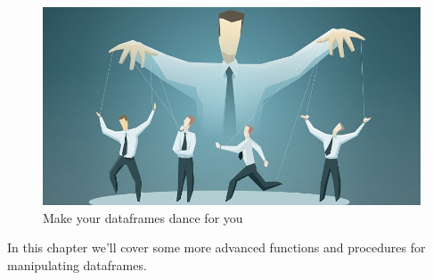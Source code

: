 \documentclass[]{book}
\theoremstyle{definition}
\theoremstyle{definition}
\theoremstyle{remark}
\begin{document}
\begin{figure}

{\centering \includegraphics[width=0.75\linewidth]{images/manipulation} 

}

\caption{Make your dataframes dance for you}\label{fig:dance}
\end{figure}

In this chapter we'll cover some more advanced functions and procedures
for manipulating dataframes.
\end{document}
